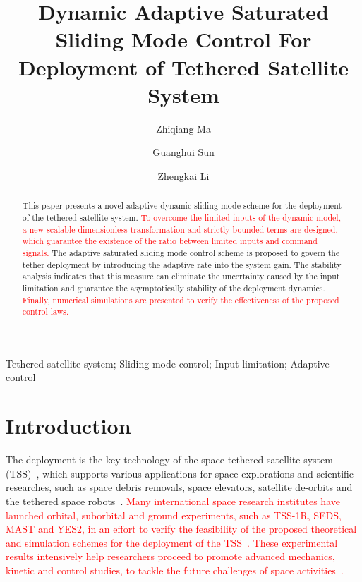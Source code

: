 \documentclass[3p]{elsarticle}
\theoremstyle{plain}
\theoremstyle{remark}
\begin{document}
\begin{frontmatter}
\title{Dynamic Adaptive Saturated Sliding Mode Control For Deployment of Tethered Satellite System}
\author{Zhiqiang Ma}
\author{Guanghui Sun}
{\author{Zhengkai Li}}
\address{Research Institute of Intelligent Control and Systems, Harbin Institute of Technology, Harbin 150001, China}



\begin{abstract}
This paper presents a novel adaptive dynamic sliding mode scheme for the deployment of the tethered satellite system. \textcolor{red}{To overcome the limited inputs of the dynamic model, a new scalable dimensionless transformation and strictly bounded terms are designed, which guarantee the existence of the ratio between limited inputs and command signals.} The adaptive saturated sliding mode control scheme is proposed to govern the tether deployment by introducing the adaptive rate into the system gain. The stability analysis indicates that this measure can eliminate the uncertainty caused by the input limitation and guarantee the asymptotically stability of the deployment dynamics. \textcolor{red}{Finally, numerical simulations are presented to verify the effectiveness of the proposed control laws.}
\end{abstract}
\begin{keyword}
Tethered satellite system;  Sliding mode control;  Input limitation; Adaptive control
\end{keyword}
\end{frontmatter}
\section{Introduction}
The deployment is the key technology of the space tethered satellite system (TSS)~\cite{wen2008advances,yousefian2015anti}, which supports various applications for space explorations and scientific researches, such as space debris removals, space elevators, satellite de-orbits and the tethered space robots~\cite{zhao2014thrust,kojima2015mission,zhong2013dynamics,zhong2013long,huang2014optimal,Huang2016Impact,Huang201637,Huang2016}. \textcolor{red}{Many international space research institutes have launched orbital, suborbital and ground experiments, such as TSS-1R, SEDS, MAST and YES2, in an effort to verify the feasibility of the proposed theoretical and simulation schemes for the deployment of the TSS~\cite{williams2012review,robitaille2006interpreting,stone1998tss,williams2009yes2}. These experimental results intensively help researchers proceed to promote advanced mechanics, kinetic and control studies, to tackle the future challenges of space activities~\cite{yu2016nonlinear,wen2015space,aslanov2016swing,meng2016lyapunov,zhang2015line,Xu2016Hybrid}.}\par
\end{document}
